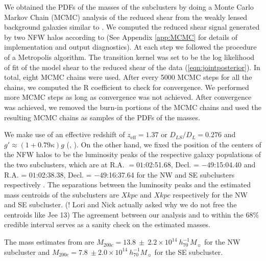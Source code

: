 We obtained the PDFs of the masses of the subclusters by doing a Monte
Carlo Markov Chain (MCMC) analysis of the reduced shear from the
weakly lensed background galaxies similar to \citet{Dawson12}. We computed the reduced shear signal
generated by two NFW halos according to \citet{Umetsu10} (See Appendix
\ref{app:MCMC} for
details of implementation and output diagnostics).
At each step we followed the procedure of a
Metropolis algorithm.  The transition kernel was set to
be the log likelihood of fit of the model shear to the reduced shear of the
data (\ref{eqn:jointposterior}).
In total, eight MCMC chains were used. After every 5000 MCMC steps for all
the chains, we computed the R coefficient \citep{Gelman92}  to
check for convergence. We performed more MCMC steps as long as convergence
was not achieved. After convergence was achieved, we removed the
burn-in portions of the MCMC chains and used the resulting MCMC chains as
samples of the PDFs of the masses. \par 
We make use of an effective redshift of $z_{\text{eff}} = 1.37$ or $D_{LS}
/ D_L = 0.276$  and $g'\approx(1 + 0.79 \kappa)g$
(, \citealt{Seitz97}).    
On the other hand, we fixed the
position of the centers of the NFW halos to be  the luminosity peaks of the
respective galaxy populations of  the two subclusters, which are at R.A. $=
01$:02:51.68, Decl. = $-49$:15:04.40 and R.A. = $01$:02:38.38, Decl. =
$-49$:16:37.64 for the NW and SE subclusters
respectively . The separations between the luminosity
peaks and the estimated mass centroids of the subclusters are $X kpc$ and
$X kpc$ respectively for the NW and SE subcluster.  (! Lori and Nick actually asked why we do not free
the centroids like Jee 13)  The agreement between our analysis and  to within
the 68\% credible interval serves as a sanity check on the estimated masses. 

The mass estimates from \citealt{Jee13} are $M_{200c} = 13.8~\pm~2.2\times
10^{14}~h_{70}^{-1} M_{\sun}$ for the NW subcluster and $M_{200c} = 7.8~\pm
2.0\times10^{14}~h_{70}^{-1} M_{\sun}$ for the SE subcluster. 
